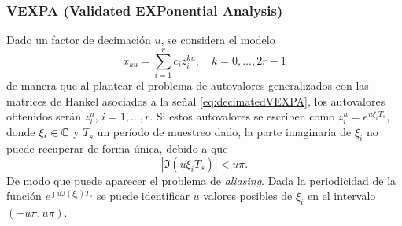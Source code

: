 	
	
	
	
	\subsubsection{VEXPA (Validated EXPonential Analysis)}\label{VEXPA_Appendix}

	 Dado un factor de decimación $u$, se considera el modelo 
		\begin{equation}
			x_{ku} = \sum_{i=1}^r c_iz_i^{ku}, \quad k = 0,\ldots, 2r-1
			\label{eq:decimatedVEXPA}
		\end{equation}
		de manera que al plantear el problema de autovalores generalizados con las matrices de Hankel asociados a la señal \eqref{eq:decimatedVEXPA}, los autovalores obtenidos serán $z_i^u$, $i=1,\ldots, r$. Si estos autovalores se escriben como $z_i^u = e^{u\xi_iT_s}$, donde $\xi_i\in \mathbb{C}$ y $T_s$ un período de muestreo dado, la parte imaginaria de $\xi_i$ no puede recuperar de forma única, debido a que 
		\[|\Im(u\xi_iT_s)|<u\pi.\]
		De modo que puede aparecer el problema de \emph{aliasing}. Dada la periodicidad de la función $e^{\jmath u\Im(\xi_i)T_s}$ se puede identificar $u$ valores posibles de $\xi_i$ en el intervalo  $(-u\pi,u\pi)$.

